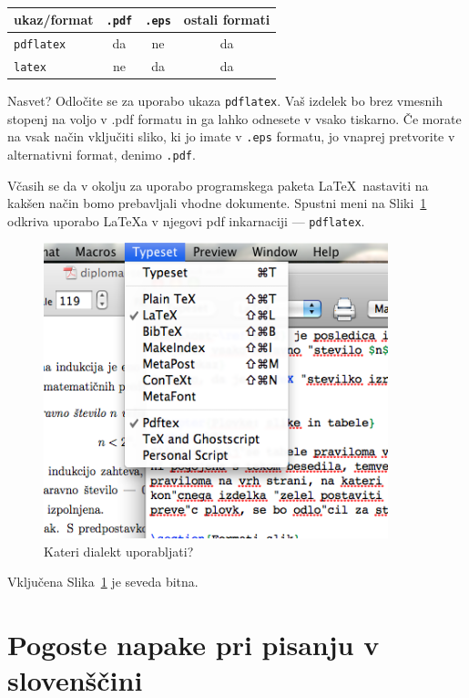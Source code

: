 \documentclass[a4paper, 12pt]{book}
\begin{document}
\begin{table}
\begin{center}
\begin{tabular}{l|ccc}
ukaz/format & {\tt .pdf} & {\tt .eps} & ostali formati \\ \hline
{\tt pdflatex} & da & ne & da \\
{\tt latex}   & ne & da  & da
\end{tabular}
\end{center}
\caption{}
\label{tbl:1}
\end{table}

Nasvet? 
Odločite se za uporabo ukaza {\tt pdflatex}. Vaš izdelek bo brez vmesnih stopenj na voljo v {.pdf} formatu in ga lahko odnesete v vsako tiskarno. 
Če morate na vsak način vključiti sliko, ki jo imate v {\tt .eps} formatu, jo vnaprej pretvorite v alternativni format, denimo {\tt .pdf}.

Včasih se da v okolju za uporabo programskega paketa \LaTeX\ nastaviti na kakšen način bomo prebavljali vhodne dokumente. 
Spustni meni na Sliki~\ref{pic2} odkriva uporabo \LaTeX{}a v njegovi pdf inkarnaciji --- {\tt pdflatex}.
\begin{figure}[t]
\begin{center}
\includegraphics[width=10cm]{pic2.png}
\end{center}
\caption{Kateri dialekt uporabljati?}
\label{pic2}
\end{figure}
Vključena Slika~\ref{pic2} je seveda bitna.



\chapter{Pogoste napake pri pisanju v slovenščini}  %
\label{slo}
\end{document}
